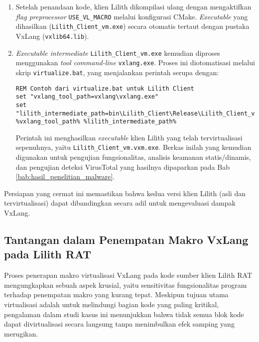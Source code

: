 \begin{enumerate}
    \item {}
    Setelah penandaan kode, klien Lilith dikompilasi ulang dengan mengaktifkan \textit{flag preprocessor} \texttt{USE\_VL\_MACRO} melalui konfigurasi CMake. \textit{Executable} yang dihasilkan (\texttt{Lilith\_Client\_vm.exe}) secara otomatis tertaut dengan pustaka VxLang (\texttt{vxlib64.lib}).

    \item {}
    \textit{Executable intermediate} \texttt{Lilith\_Client\_vm.exe} kemudian diproses menggunakan \textit{tool command-line} \texttt{vxlang.exe}. Proses ini diotomatisasi melalui skrip \texttt{virtualize.bat}, yang menjalankan perintah serupa dengan:
    \begin{listing}[H]
    \begin{verbatim}
REM Contoh dari virtualize.bat untuk Lilith Client
set "vxlang_tool_path=vxlang\vxlang.exe"
set "lilith_intermediate_path=bin\Lilith_Client\Release\Lilith_Client_vm.exe"
%vxlang_tool_path% %lilith_intermediate_path%
    \end{verbatim}
    \label{lst:virtualize_lilith_example_bab4_revised}
    \end{listing}
    Perintah ini menghasilkan \textit{executable} klien Lilith yang telah tervirtualisasi sepenuhnya, yaitu \texttt{Lilith\_Client\_vm.vxm.exe}. Berkas inilah yang kemudian digunakan untuk pengujian fungsionalitas, analisis keamanan statis/dinamis, dan pengujian deteksi VirusTotal yang hasilnya dipaparkan pada Bab \ref{bab:hasil_penelitian_malware}.
\end{enumerate}

Persiapan yang cermat ini memastikan bahwa kedua versi klien Lilith (asli dan tervirtualisasi) dapat dibandingkan secara adil untuk mengevaluasi dampak VxLang.

\subsection{Tantangan dalam Penempatan Makro VxLang pada Lilith RAT}
\label{subsec:tantangan_makro_lilith}
Proses penerapan makro virtualisasi VxLang pada kode sumber klien Lilith RAT mengungkapkan sebuah aspek krusial, yaitu sensitivitas fungsionalitas program terhadap penempatan makro yang kurang tepat. Meskipun tujuan utama virtualisasi adalah untuk melindungi bagian kode yang paling kritikal, pengalaman dalam studi kasus ini menunjukkan bahwa tidak semua blok kode dapat divirtualisasi secara langsung tanpa menimbulkan efek samping yang merugikan.

